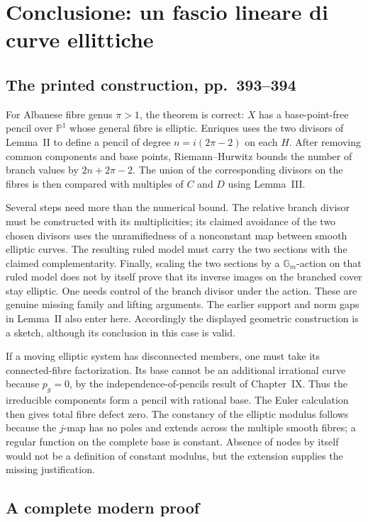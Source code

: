 \section{Conclusione: un fascio lineare di curve ellittiche}
\label{cp2-x-10}

\subsection{The printed construction, pp.~393--394}

For Albanese fibre genus $\pi>1$, the theorem is correct: $X$ has a base-point-free pencil over $\mathbb P^1$ whose general fibre is elliptic. Enriques uses the two divisors of Lemma~II to define a pencil of degree $n=i(2\pi-2)$ on each $H$. After removing common components and base points, Riemann--Hurwitz bounds the number of branch values by $2n+2\pi-2$. The union of the corresponding divisors on the fibres is then compared with multiples of $C$ and $D$ using Lemma~III.

Several steps need more than the numerical bound. The relative branch divisor must be constructed with its multiplicities; its claimed avoidance of the two chosen divisors uses the unramifiedness of a nonconstant map between smooth elliptic curves. The resulting ruled model must carry the two sections with the claimed complementarity. Finally, scaling the two sections by a $\mathbb G_m$-action on that ruled model does not by itself prove that its inverse images on the branched cover stay elliptic. One needs control of the branch divisor under the action. These are genuine missing family and lifting arguments. The earlier support and norm gaps in Lemma~II also enter here. Accordingly the displayed geometric construction is a sketch, although its conclusion in this case is valid.

If a moving elliptic system has disconnected members, one must take its connected-fibre factorization. Its base cannot be an additional irrational curve because $p_g=0$, by the independence-of-pencils result of Chapter~IX. Thus the irreducible components form a pencil with rational base. The Euler calculation then gives total fibre defect zero. The constancy of the elliptic modulus follows because the $j$-map has no poles and extends across the multiple smooth fibres; a regular function on the complete base is constant. Absence of nodes by itself would not be a definition of constant modulus, but the extension supplies the missing justification.

\subsection{A complete modern proof}

